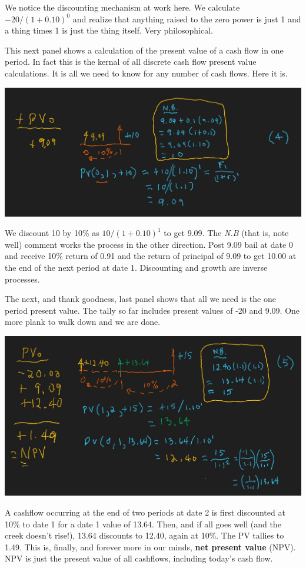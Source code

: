 \documentclass[
]{book}
\begin{document}
We notice the discounting mechanism at work here. We calculate \(-20/(1+0.10)^0\) and realize that anything raised to the zero power is just 1 and a thing times 1 is just the thing itself. Very philosophical.

This next panel shows a calculation of the present value of a cash flow in one period. In fact this is the kernal of all discrete cash flow present value calculations. It is all we need to know for any number of cash flows. Here it is.

\includegraphics{images/02/pie-pv-dwg3.jpg}

We discount 10 by 10\% as \(10/(1+0.10)^1\) to get 9.09. The \emph{N.B} (that is, note well) comment works the process in the other direction. Post 9.09 bail at date 0 and receive 10\% return of 0.91 and the return of principal of 9.09 to get 10.00 at the end of the next period at date 1. Discounting and growth are inverse processes.

The next, and thank goodness, last panel shows that all we need is the one period present value. The tally so far includes present values of -20 and 9.09. One more plank to walk down and we are done.

\includegraphics{images/02/pie-pv-dwg4.jpg}

A cashflow occurring at the end of two periods at date 2 is first discounted at 10\% to date 1 for a date 1 value of 13.64. Then, and if all goes well (and the creek doesn't rise!), 13.64 discounts to 12.40, again at 10\%. The PV tallies to 1.49. This is, finally, and forever more in our minds, \textbf{net present value} (NPV). NPV is just the present value of all cashflows, including today's cash flow.
\end{document}
